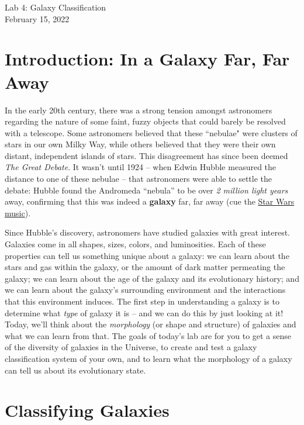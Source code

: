 \documentclass[11pt]{article}
\begin{document}
\begin{center}
\huge{Lab 4: Galaxy Classification}\\ \medskip \Large{February 15, 2022}
\end{center}

\section{Introduction: In a Galaxy Far, Far Away}
In the early 20th century, there was a strong tension amongst astronomers regarding the nature of some faint, fuzzy objects that could barely be resolved with a telescope. Some astronomers believed that these ``nebulae" were clusters of stars in our own Milky Way, while others believed that they were their own distant, independent islands of stars. This disagreement has since been deemed \textit{The Great Debate}. It wasn't until 1924 -- when Edwin Hubble measured the distance to one of these nebulae -- that astronomers were able to settle the debate: Hubble found the Andromeda ``nebula'' to be over \emph{2 million light years} away, confirming that this was indeed a \textbf{galaxy} far, far away (cue the \href{https://www.youtube.com/watch?v=MNMSAIG0dfQ}{Star Wars music}).


\medskip
Since Hubble's discovery, astronomers have studied galaxies with great interest. Galaxies come in all shapes, sizes, colors, and luminosities.  Each of these properties can tell us something unique about a galaxy: we can learn about the stars and gas within the galaxy, or the amount of dark matter permeating the galaxy; we can learn about the age of the galaxy and its evolutionary history; and we can learn about the galaxy's surrounding environment and the interactions that this environment induces. The first step in understanding a galaxy is to determine what \emph{type} of galaxy it is -- and we can do this by just looking at it!  Today, we'll think about the \textit{morphology} (or shape and structure) of galaxies and what we can learn from that. The goals of today's lab are for you to get a sense of the diversity of galaxies in the Universe, to create and test a galaxy classification system of your own, and to learn what the morphology of a galaxy can tell us about its evolutionary state.

\section{Classifying Galaxies}
\end{document}

